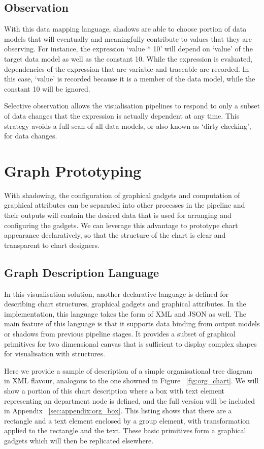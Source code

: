 \documentclass[11pt, a4paper]{report}
\begin{document}
\subsection{Observation}
With this data mapping language, shadows are able to choose portion of data models that will eventually and meaningfully contribute to values that they are observing. For instance, the expression `value * 10' will depend on `value' of the target data model as well as the constant 10. While the expression is evaluated, dependencies of the expression that are variable and traceable are recorded. In this case, `value' is recorded because it is a member of the data model, while the constant 10 will be ignored.

Selective observation allows the visualisation pipelines to respond to only a subset of data changes that the expression is actually dependent at any time. This strategy avoids a full scan of all data models, or also known as `dirty checking', for data changes.
\section{Graph Prototyping}
With shadowing, the configuration of graphical gadgets and computation of graphical attributes can be separated into other processes in the pipeline and their outputs will contain the desired data that is used for arranging and configuring the gadgets. We can leverage this advantage to prototype chart appearance declaratively, so that the structure of the chart is clear and transparent to chart designers.
\subsection{Graph Description Language}
In this visualisation solution, another declarative language is defined for describing chart structures, graphical gadgets and graphical attributes. In the implementation, this language takes the form of XML and JSON as well. The main feature of this language is that it supports data binding from output models or shadows from previous pipeline stages. It provides a subset of graphical primitives for two dimensional canvas that is sufficient to display complex shapes for visualisation with structures.

Here we provide a sample of description of a simple organisational tree diagram in XML flavour, analogous to the one showned in Figure~ \ref{fig:org_chart}. We will show a portion of this chart description where a box with text element representing an department node is defined, and the full version will be included in Appendix ~\ref{sec:appendix:org_box}. This listing shows that there are a rectangle and a text element enclosed by a group element, with transformation applied to the rectangle and the text. These basic primitives form a graphical gadgets which will then be replicated elsewhere.
\end{document}
